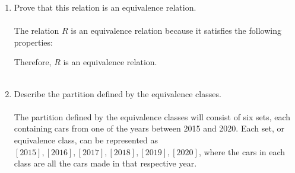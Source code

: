 \documentclass{amsart}
\theoremstyle{definition}
\theoremstyle{Exercise}
\theoremstyle{remark}
\theoremstyle{rule}
\numberwithin{equation}{section}
\begin{document}
	\begin{enumerate}[label=(\alph{*})]
		\item Prove that this relation is an equivalence relation. \\\\
			The relation $R$ is an equivalence relation because it satisfies the following
			properties: 

			Therefore, $R$ is an equivalence relation. \\\\

		\item Describe the partition defined by the equivalence classes. \\\\
			The partition defined by the equivalence classes will consist of six sets,
			each containing cars from one of the years between 2015 and 2020. Each set,
			or equivalence class, can be represented as
			$[2015], [2016], [2017], [2018], [2019], [2020]$, where the cars in each class
			are all the cars made in that respective year. \\\\
	\end{enumerate}
	\newpage
	~\\
\end{document}
